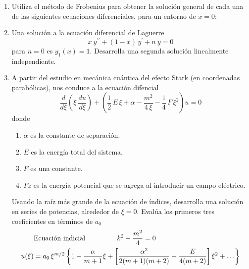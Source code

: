 \begin{enumerate}
\item Utiliza el método de Frobenius para obtener la solución general de cada una de las siguientes ecuaciones diferenciales, para un entorno de $x = 0$:
\begin{enumerate}[label=\alph*)]
\end{enumerate}
\item Una solución a la ecuación diferencial de Laguerre
\[ x \: y^{\prime \prime} + (1 - x) \, y^{\prime} + n \: y = 0\]
para $n = 0$ es $y_{1}(x) = 1$. Desarrolla una segunda solución linealmente independiente.
\item A partir del estudio en mecánica cuántica del efecto Stark (en coordenadas parabólicas), nos conduce a la ecuación difencial
\[ \dfrac{d}{d \xi} \left( \xi \: \dfrac{d u}{d \xi} \right) + \left( \dfrac{1}{2} \, E \, \xi + \alpha - \dfrac{m^{2}}{4 \, \xi} - \dfrac{1}{4} \, F \,\xi^{2} \right) u = 0 \]
donde
\begin{enumerate}[label=\roman*)]
\item $\alpha$ es la constante de separación.
\item $E$ es la energía total del sistema.
\item $F$ es una constante.
\item $Fz$ es la energía potencial que se agrega al introducir un campo eléctrico.
\end{enumerate}
Usando la raíz más grande de la ecuación de índices, desarrolla una solución en series de potencias, alrededor de $\xi = 0$. Evalúa los primeros tres coeficientes en términos de $a_{0}$
\[  \begin{split}
& \text{Ecuación indicial } \hspace{1.5cm} k^{2} - \dfrac{m^{2}}{4} = 0 \\
u(\xi) &=  a_{0} \, \xi^{m/2} \left\lbrace 1 - \dfrac{\alpha}{m+1} \xi + \left[ \dfrac{\alpha^{2}}{2(m+1)(m+2)} - \dfrac{E}{4(m+2)} \right] \xi^{2} + \ldots \right\rbrace
\end{split} \]

\end{enumerate}
